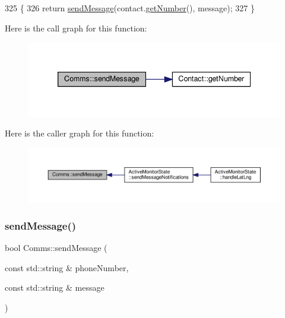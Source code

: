 \begin{DoxyCode}
325 \{
326    \textcolor{keywordflow}{return} \hyperlink{class_comms_a30ab10ea604ab2b169ca66f3f1071c0e}{sendMessage}(contact.\hyperlink{class_contact_a612095b153e05538c32400c4c44cb1aa}{getNumber}(), message);
327 \}
\end{DoxyCode}
Here is the call graph for this function\+:
\nopagebreak
\begin{figure}[H]
\begin{center}
\leavevmode
\includegraphics[width=339pt]{d8/dcc/class_comms_a30ab10ea604ab2b169ca66f3f1071c0e_cgraph}
\end{center}
\end{figure}
Here is the caller graph for this function\+:
\nopagebreak
\begin{figure}[H]
\begin{center}
\leavevmode
\includegraphics[width=350pt]{d8/dcc/class_comms_a30ab10ea604ab2b169ca66f3f1071c0e_icgraph}
\end{center}
\end{figure}
\mbox{\label{class_comms_ad28b072a0852ac95aa2475324cbfae60}} 
\subsubsection{\texorpdfstring{send\+Message()}{sendMessage()}\hspace{0.1cm}{\footnotesize\ttfamily [2/2]}}
{\footnotesize\ttfamily bool Comms\+::send\+Message (\begin{DoxyParamCaption}\item[{const std\+::string \&}]{phone\+Number,  }\item[{const std\+::string \&}]{message }\end{DoxyParamCaption})}


